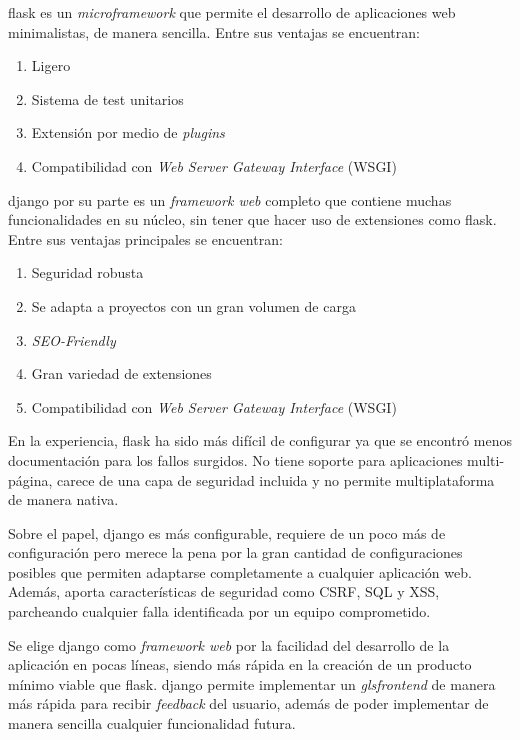 \Gls{flask} es un \emph{microframework} que permite el desarrollo de aplicaciones web minimalistas, de manera sencilla. Entre sus ventajas se encuentran:
\begin{enumerate}
    \item Ligero
    \item Sistema de test unitarios
    \item Extensión por medio de \emph{plugins}
    \item Compatibilidad con \emph{Web Server Gateway Interface} (\gls{WSGI})
\end{enumerate}

\Gls{django} por su parte es un \emph{\gls{framework} web} completo que contiene muchas funcionalidades en su núcleo, sin tener que hacer uso de extensiones como \Gls{flask}. Entre sus ventajas principales se encuentran:
\begin{enumerate}
    \item Seguridad robusta
    \item Se adapta a proyectos con un gran volumen de carga
    \item \emph{\gls{SEO}-Friendly}
    \item Gran variedad de extensiones
    \item Compatibilidad con \emph{Web Server Gateway Interface} (\gls{WSGI})
\end{enumerate}

En la experiencia, \Gls{flask} ha sido más difícil de configurar ya que se encontró menos documentación para los fallos surgidos. No tiene soporte para aplicaciones multi-página, carece de una capa de seguridad incluida y no permite multiplataforma de manera nativa.

Sobre el papel, \Gls{django} es más configurable, requiere de un poco más de configuración pero merece la pena por la gran cantidad de configuraciones posibles que permiten adaptarse completamente a cualquier aplicación web. Además, aporta características de seguridad como \gls{CSRF}, \gls{SQL} y \gls{XSS}, parcheando cualquier falla identificada por un equipo comprometido. \cite{frameworkionos2023}\cite{frameworkkinsta2023}

Se elige \Gls{django} como \emph{framework web} por la facilidad del desarrollo de la aplicación en pocas líneas, siendo más rápida en la creación de un producto mínimo viable que \Gls{flask}. \Gls{django} permite implementar un \emph{gls{frontend}} de manera más rápida para recibir \emph{feedback} del usuario, además de poder implementar de manera sencilla cualquier funcionalidad futura.

